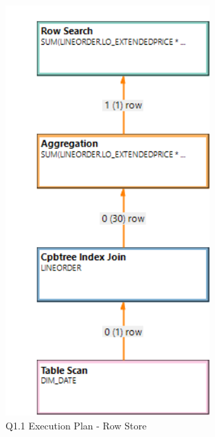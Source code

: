 \begin{figure}[H]
	\centering
	\includegraphics[width=0.7\textwidth]{images/q1-1-row-exec.png}
	\caption{Q1.1 Execution Plan - Row Store}\label{exec:q1.1-row}
\end{figure}
